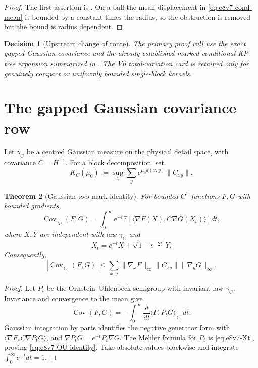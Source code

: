 \documentclass[11pt,oneside]{book}
\newtheorem{theorem}{Theorem}[chapter]
\newtheorem{decision}[theorem]{Decision}
\theoremstyle{definition}
\theoremstyle{remark}
\begin{document}
\begin{proof}
The first assertion is .  On a ball the
mean displacement in \eqref{eq:e8v7-cond-mean} is bounded by a
constant times the radius, so the obstruction is removed but the
bound is radius dependent.
\end{proof}

\begin{decision}[Upstream change of route]
\label{dec:e8v7-route}
The primary proof will use the exact gapped Gaussian covariance and
the already established marked conditional KP tree expansion
summarized in .  The V6 total-variation card is
retained only for genuinely compact or uniformly bounded
single-block kernels.
\end{decision}

\section{The gapped Gaussian covariance row}
\label{sec:e8v7-Gaussian}

Let \(\gamma_C\) be a centred Gaussian measure on the physical detail
space, with covariance \(C=H^{-1}\).  For a block decomposition, set
\[
 K_C(\mu_0):=
 \sup_x\sum_y e^{\mu_0d(x,y)}\|C_{xy}\|.             \label{eq:e8v7-KC}
\]

\begin{theorem}[Gaussian two-mark identity]
\label{thm:e8v7-Gaussian-covariance}
For bounded \(C^1\) functions \(F,G\) with bounded gradients,
\[
 \operatorname{Cov}_{\gamma_C}(F,G)
 =
 \int_0^\infty e^{-t}
 \mathbb E\!\left[
   \langle\nabla F(X),C\nabla G(X_t)\rangle
 \right]dt,                                         \label{eq:e8v7-OU-identity}
\]
where \(X,Y\) are independent with law \(\gamma_C\) and
\[
 X_t=e^{-t}X+\sqrt{1-e^{-2t}}\,Y.                   \label{eq:e8v7-Xt}
\]
Consequently,
\[
 |\operatorname{Cov}_{\gamma_C}(F,G)|
 \le\sum_{x,y}\|\nabla_xF\|_\infty
       \|C_{xy}\|\|\nabla_yG\|_\infty.               \label{eq:e8v7-Gaussian-bound}
\]
\end{theorem}

\begin{proof}
Let \(P_t\) be the Ornstein--Uhlenbeck semigroup with invariant law
\(\gamma_C\).  Invariance and convergence to the mean give
\[
 \operatorname{Cov}(F,G)
 =-\int_0^\infty\frac d{dt}
   \langle F,P_tG\rangle_{\gamma_C}\,dt.
\]
Gaussian integration by parts identifies the negative generator
form with
\(\langle\nabla F,C\nabla P_tG\rangle\), and
\(\nabla P_tG=e^{-t}P_t\nabla G\).  The Mehler formula for \(P_t\)
is \eqref{eq:e8v7-Xt}, proving \eqref{eq:e8v7-OU-identity}.
Take absolute values blockwise and integrate
\(\int_0^\infty e^{-t}dt=1\).
\end{proof}
\end{document}
